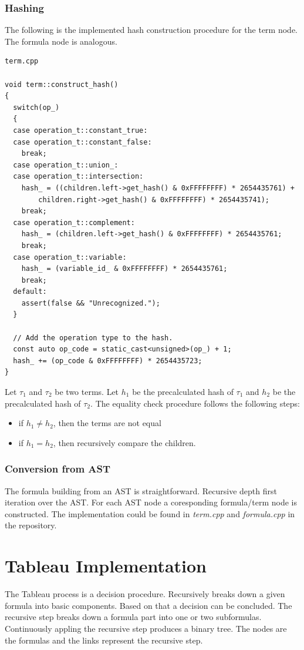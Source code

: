 \documentclass{article}
\begin{document}
	\subsubsection{Hashing}
	The following is the implemented hash construction procedure for the term node. The formula node is analogous.

\begin{lstlisting}
term.cpp

void term::construct_hash()
{
  switch(op_)
  {
  case operation_t::constant_true:
  case operation_t::constant_false:
    break;
  case operation_t::union_:
  case operation_t::intersection:
    hash_ = ((children.left->get_hash() & 0xFFFFFFFF) * 2654435761) +
        children.right->get_hash() & 0xFFFFFFFF) * 2654435741);
    break;
  case operation_t::complement:
    hash_ = (children.left->get_hash() & 0xFFFFFFFF) * 2654435761;
    break;
  case operation_t::variable:
    hash_ = (variable_id_ & 0xFFFFFFFF) * 2654435761;
    break;
  default:
    assert(false && "Unrecognized.");
  }

  // Add the operation type to the hash.
  const auto op_code = static_cast<unsigned>(op_) + 1;
  hash_ += (op_code & 0xFFFFFFFF) * 2654435723;
}
\end{lstlisting}

	Let $\tau_1$ and $\tau_2$ be two terms. Let $h_1$ be the precalculated hash of $\tau_1$ and $h_2$ be the precalculated hash of $\tau_2$.
	The equality check procedure follows the following steps:
	\begin{itemize}
		\item if $h_1 \neq h_2$, then the terms are not equal
		\item if $h_1 = h_2$, then recursively compare the children.
	\end{itemize}
	\noindent

	\newpage
	\subsubsection{Conversion from AST}
	The formula building from an AST is straightforward. Recursive depth first iteration over the AST. For each AST node a coresponding formula/term node is constructed. The implementation could be found in \textit{term.cpp} and \textit{formula.cpp} in the repository.

	\newpage
	\section{Tableau Implementation}
	The Tableau process is a decision procedure. Recursively breaks down a given formula into basic components. Based on that a decision can be concluded. The recursive step breaks down a formula part into one or two subformulas. Continuously appling the recursive step produces a binary tree. The nodes are the formulas and the links represent the recursive step.
\end{document}
